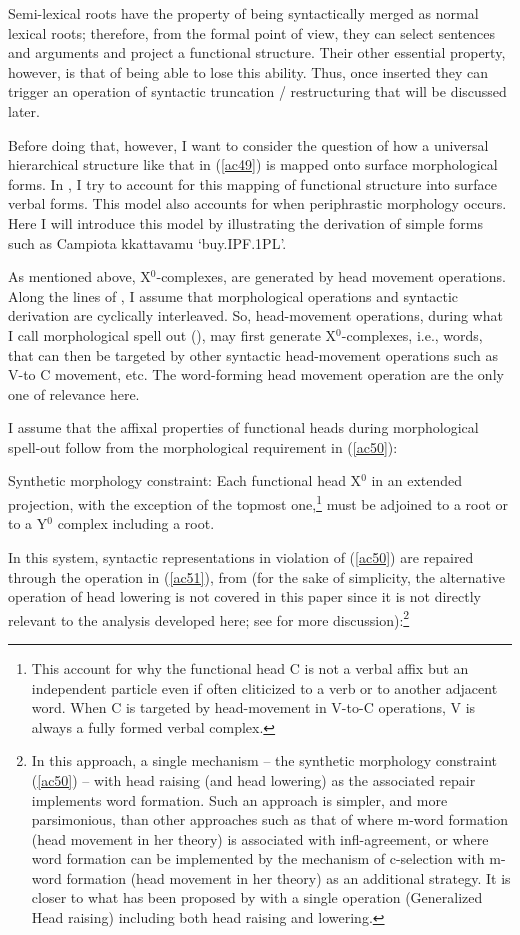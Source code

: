 \documentclass[output=paper]{langscibook}
\begin{document}
Semi-lexical roots have the property of being syntactically merged as normal lexical roots; therefore, from the formal point of view, they can select sentences and arguments and project a functional structure.  Their other essential property, however, is that of being able to lose this ability. Thus, once inserted they can trigger an operation of syntactic truncation / restructuring that will be discussed later. 

Before doing that, however, I want to consider  the question of how a universal hierarchical structure like that in (\ref{ac49}) is mapped onto surface morphological forms. In \cite{calabrese2019a}, I try to account for this mapping of functional structure into surface verbal forms. This model also accounts for when periphrastic morphology occurs. Here I will introduce this model by illustrating the derivation of simple forms such as Campiota kkattavamu ‘buy.IPF.1PL’.

As mentioned above, X$^0$-complexes, are generated by head movement operations. Along the lines of \cite{calabrese2014a}, I assume that morphological operations and syntactic derivation are cyclically interleaved. So, head-movement operations, during what I call morphological spell out (\cite{calabrese2019a}), may first generate X$^0$-complexes, i.e., words, that can then be targeted by other syntactic head-movement operations such as V-to C movement, etc. The word-forming head movement operation are the only one of relevance here.  

I assume that the affixal properties of functional heads during morphological spell-out follow from the morphological requirement in (\ref{ac50}):

\ea \label{ac50}Synthetic morphology constraint:       
Each functional head X$^0$ in an extended projection, with the exception of the topmost one,\footnote{This account for why the functional head C is not a verbal affix but an independent particle even if often cliticized to a verb or to another adjacent word.  When C is targeted by head-movement in V-to-C operations, V is always a fully formed verbal complex.} must be adjoined to a root or to a Y$^0$ complex including a root.
\z

In this system, syntactic representations in violation of (\ref{ac50}) are repaired through the operation in (\ref{ac51}), from \cite{harizanov2019a} (for the sake of simplicity, the alternative operation of head lowering is not covered in this paper since it is not directly relevant to the analysis developed here; see \cite{calabrese2019a} for more discussion):\footnote{In this approach, a single mechanism -- the synthetic morphology constraint (\ref{ac50}) --  with head raising (and head lowering) as the associated repair implements word formation. Such an approach is simpler, and more parsimonious, than other approaches such as that of \cite{bjorkman2011a} where m-word formation (head movement in her theory) is associated with infl-agreement, or \cite{pietraszko2017a} where word formation can be implemented by the mechanism of c-selection with m-word formation (head movement in her theory) as an additional strategy. It is closer to what has been proposed by \cite{arregi2018a} with a single operation (Generalized Head raising) including both head raising and lowering.}
\end{document}
